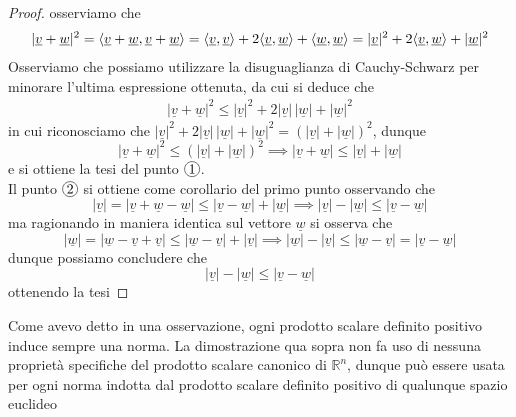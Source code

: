 \begin{proof}
osserviamo che
\begin{align*}
|\underline{v} + \underline{w}|^2 = \langle \underline{v} + \underline{w}, \underline{v} + \underline{w} \rangle = \langle \underline{v}, \underline{v} \rangle + 2\langle \underline{v}, \underline{w} \rangle + \langle \underline{w}, \underline{w} \rangle = |\underline{v}|^2 + 2 \langle \underline{v}, \underline{w} \rangle + |\underline{w}|^2
\end{align*}
Osserviamo che possiamo utilizzare la disuguaglianza di Cauchy-Schwarz per minorare l'ultima espressione ottenuta, da cui si deduce che
\begin{align*}
|\underline{v} + \underline{w}|^2 \leq |\underline{v}|^2 + 2|\underline{v}| \, |\underline{w}| + |\underline{w}|^2
\end{align*}
in cui riconosciamo che $|\underline{v}|^2 + 2 |\underline{v}| \, |\underline{w}| + |\underline{w}|^2 = (|\underline{v}| + |\underline{w}|)^2$, dunque
$$
|\underline{v} + \underline{w}|^2 \leq (|\underline{v}| + |\underline{w}|)^2 \implies |\underline{v} + \underline{w}| \leq |\underline{v}| + |\underline{w}|
$$
e si ottiene la tesi del punto $\circled{1}$. \\
Il punto $\circled{2}$ si ottiene come corollario del primo punto osservando che
$$
|\underline{v}| = |\underline{v} + \underline{w} - \underline{w}| \leq |\underline{v} - \underline{w}| + |\underline{w}| \implies |\underline{v}| - |\underline{w}| \leq |\underline{v} - \underline{w}| 
$$
ma ragionando in maniera identica sul vettore $\underline{w}$ si osserva che
$$
|\underline{w}| = |\underline{w} - \underline{v} + \underline{v}| \leq |\underline{w} - \underline{v}| + |\underline{v}| \implies |\underline{w}| - |\underline{v}| \leq |\underline{w} - \underline{v}|= |\underline{v} - \underline{w}|
$$
dunque possiamo concludere che
$$
|\underline{v}| - |\underline{w}| \leq |\underline{v} - \underline{w}|
$$
ottenendo la tesi
\end{proof}
\begin{remark}
Come avevo detto in una osservazione, ogni prodotto scalare definito positivo induce sempre una norma. La dimostrazione qua sopra non fa uso di nessuna proprietà specifiche del prodotto scalare canonico di $\mathbb{R}^n$, dunque può essere usata per ogni norma indotta dal prodotto scalare definito positivo di qualunque spazio euclideo
\end{remark}
